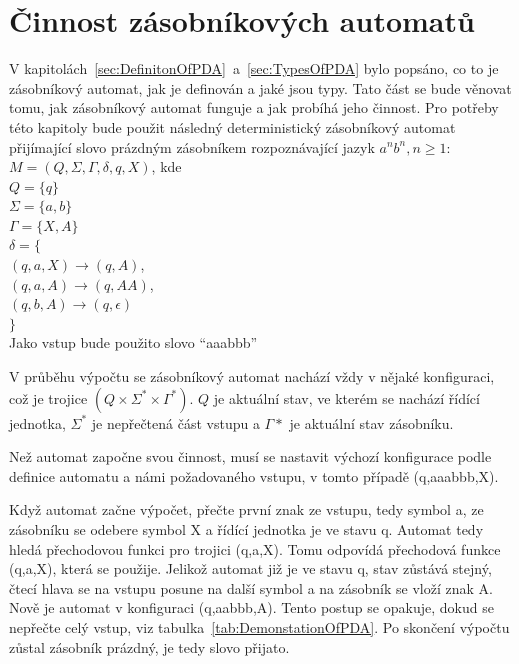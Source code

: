 \section{Činnost zásobníkových automatů}

V kapitolách~\ref{sec:DefinitonOfPDA}~a~\ref{sec:TypesOfPDA} bylo popsáno, co to je zásobníkový automat, jak je definován a jaké jsou typy. Tato část se bude věnovat tomu, jak zásobníkový automat funguje a jak probíhá jeho činnost. Pro potřeby této kapitoly bude použit následný deterministický zásobníkový automat přijímající slovo prázdným zásobníkem rozpoznávající jazyk $a^{n}b^{n}, n \ge 1$:\\
$M = (Q, \Sigma, \Gamma, \delta, q, X)$, kde \\
\indent$Q = \{q\}$\\
\indent$\Sigma = \{a,b\}$\\
\indent$\Gamma = \{X,A\}$\\
\indent$\delta = \{$\\
\indent\indent$(q,a,X) \rightarrow (q,A)$,\\
\indent\indent$(q,a,A) \rightarrow (q,AA)$,\\
\indent\indent$(q,b,A) \rightarrow (q,\epsilon)$\\
\indent$\}$\\
Jako vstup bude použito slovo ``aaabbb''

V průběhu výpočtu se zásobníkový automat nachází vždy v nějaké konfiguraci, což je trojice $(Q \times \Sigma^{*} \times \Gamma^{*})$. $Q$ je aktuální stav, ve kterém se nachází řídící jednotka, $\Sigma^{*}$ je nepřečtená část vstupu a $\Gamma{*}$ je aktuální stav zásobníku. 

Než automat započne svou činnost, musí se nastavit výchozí konfigurace podle definice automatu a námi požadovaného vstupu, v tomto případě (q,aaabbb,X). 

Když automat začne výpočet, přečte první znak ze vstupu, tedy symbol a, ze zásobníku se odebere symbol X a řídící jednotka je ve stavu q. Automat tedy hledá přechodovou funkci pro trojici (q,a,X). Tomu odpovídá přechodová funkce (q,a,X), která se použije. Jelikož automat již je ve stavu q, stav zůstává stejný, čtecí hlava se na vstupu posune na další symbol a na zásobník se vloží znak A. Nově je automat v konfiguraci (q,aabbb,A). Tento postup se opakuje, dokud se nepřečte celý vstup, viz tabulka~\ref{tab:DemonstationOfPDA}. Po skončení výpočtu zůstal zásobník prázdný, je tedy slovo přijato. 

